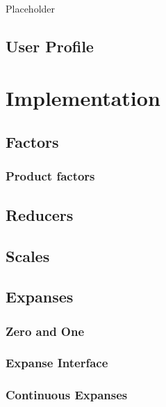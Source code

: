 \documentclass[
]{book}
\begin{document}
Placeholder

\hypertarget{user-profile}{%
\subsection{User Profile}\label{user-profile}}

\hypertarget{implementation}{%
\section{Implementation}\label{implementation}}

\hypertarget{factors}{%
\subsection{Factors}\label{factors}}

\hypertarget{product-factors}{%
\subsubsection{Product factors}\label{product-factors}}

\hypertarget{reducers}{%
\subsection{Reducers}\label{reducers}}

\hypertarget{scales-1}{%
\subsection{Scales}\label{scales-1}}

\hypertarget{expanses}{%
\subsection{Expanses}\label{expanses}}

\hypertarget{zero-and-one}{%
\subsubsection{Zero and One}\label{zero-and-one}}

\hypertarget{expanse-interface}{%
\subsubsection{Expanse Interface}\label{expanse-interface}}

\hypertarget{continuous-expanses}{%
\subsubsection{Continuous Expanses}\label{continuous-expanses}}
\end{document}
